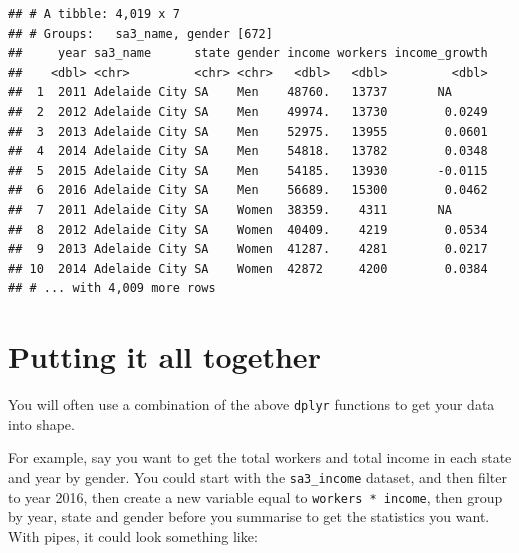\documentclass[]{book}
\newenvironment{Shaded}{\begin{snugshade}}{\end{snugshade}}
\newcommand{\DataTypeTok}[1]{\textcolor[rgb]{0.13,0.29,0.53}{#1}}
\newcommand{\DecValTok}[1]{\textcolor[rgb]{0.00,0.00,0.81}{#1}}
\newcommand{\KeywordTok}[1]{\textcolor[rgb]{0.13,0.29,0.53}{\textbf{#1}}}
\newcommand{\NormalTok}[1]{#1}
\newcommand{\OperatorTok}[1]{\textcolor[rgb]{0.81,0.36,0.00}{\textbf{#1}}}
\newcommand{\StringTok}[1]{\textcolor[rgb]{0.31,0.60,0.02}{#1}}
\begin{document}
\begin{verbatim}
## # A tibble: 4,019 x 7
## # Groups:   sa3_name, gender [672]
##     year sa3_name      state gender income workers income_growth
##    <dbl> <chr>         <chr> <chr>   <dbl>   <dbl>         <dbl>
##  1  2011 Adelaide City SA    Men    48760.   13737       NA     
##  2  2012 Adelaide City SA    Men    49974.   13730        0.0249
##  3  2013 Adelaide City SA    Men    52975.   13955        0.0601
##  4  2014 Adelaide City SA    Men    54818.   13782        0.0348
##  5  2015 Adelaide City SA    Men    54185.   13930       -0.0115
##  6  2016 Adelaide City SA    Men    56689.   15300        0.0462
##  7  2011 Adelaide City SA    Women  38359.    4311       NA     
##  8  2012 Adelaide City SA    Women  40409.    4219        0.0534
##  9  2013 Adelaide City SA    Women  41287.    4281        0.0217
## 10  2014 Adelaide City SA    Women  42872     4200        0.0384
## # ... with 4,009 more rows
\end{verbatim}

\hypertarget{putting-it-all-together}{%
\section{Putting it all together}\label{putting-it-all-together}}

You will often use a combination of the above \texttt{dplyr} functions to get your data into shape.

For example, say you want to get the total workers and total income in each state and year by gender. You could start with the \texttt{sa3\_income} dataset, and then filter to year 2016, then create a new variable equal to \texttt{workers\ *\ income}, then group by year, state and gender before you summarise to get the statistics you want. With pipes, it could look something like:

\begin{Shaded}
\end{Shaded}
\end{document}
